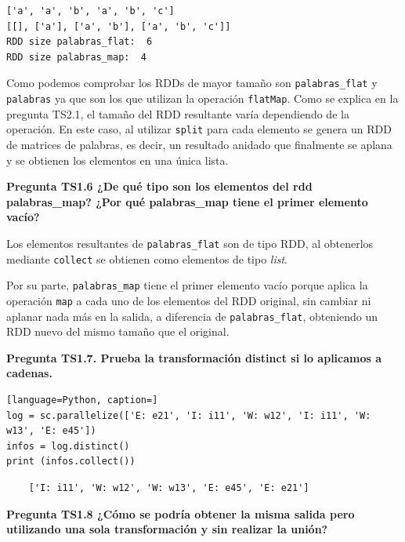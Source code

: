 \documentclass[10pt,swedish, openany]{book}
\begin{document}
\begin{verbatim}
['a', 'a', 'b', 'a', 'b', 'c']
[[], ['a'], ['a', 'b'], ['a', 'b', 'c']]
RDD size palabras_flat:  6
RDD size palabras_map:  4
\end{verbatim}

Como podemos comprobar los RDDs de mayor tamaño son \texttt{palabras\_flat} y \texttt{palabras} ya que son los que utilizan la operación \texttt{flatMap}. Como se explica en la pregunta TS2.1, el tamaño del RDD resultante varía dependiendo de la operación. En este caso, al utilizar \texttt{split} para cada elemento se genera un RDD de matrices de palabras, es decir, un resultado anidado que finalmente se aplana y se obtienen los elementos en una única lista.

\vspace{0.8em}

\textbf{Pregunta TS1.6 ¿De qué tipo son los elementos del rdd palabras\_map? ¿Por qué palabras\_map tiene el primer elemento vacío?}

Los elementos resultantes de \texttt{palabras\_flat} son de tipo RDD, al obtenerlos mediante \texttt{collect} se obtienen como elementos de tipo \textit{list}.

Por su parte, \texttt{palabras\_map} tiene el primer elemento vacío porque aplica la operación \texttt{map} a cada uno de los elementos del RDD original, sin cambiar ni aplanar nada más en la salida, a diferencia de \texttt{palabras\_flat}, obteniendo un RDD nuevo del mismo tamaño que el original.

\vspace{0.8em}

\textbf{Pregunta TS1.7. Prueba la transformación distinct si lo aplicamos a cadenas.}
\begin{lstlisting}[language=Python, caption=]
log = sc.parallelize(['E: e21', 'I: i11', 'W: w12', 'I: i11', 'W: w13', 'E: e45'])
infos = log.distinct()
print (infos.collect())
\end{lstlisting}
\begin{verbatim}
    ['I: i11', 'W: w12', 'W: w13', 'E: e45', 'E: e21']
\end{verbatim}
\vspace{0.8em}

\textbf{Pregunta TS1.8 ¿Cómo se podría obtener la misma salida pero utilizando una sola transformación y sin realizar la unión?}
\end{document}
